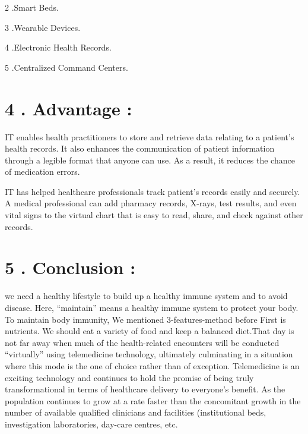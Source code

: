 \documentclass[12pt]{article}
\begin{document}
 2 .Smart Beds.
  
 3 .Wearable Devices. 
 
 4 .Electronic Health Records.
  
 5 .Centralized Command Centers.
 
\section*{ 4 . Advantage :}
 IT enables health practitioners to store and retrieve data relating to a patient's health records. It also enhances the communication of patient information through a legible format that anyone can use. As a result, it reduces the chance of medication errors. 
 

IT has helped healthcare professionals track patient's records easily and securely. A medical professional can add pharmacy records, X-rays, test results, and even vital signs to the virtual chart that is easy to read, share, and check against other records.

\section*{ 5 . Conclusion :} 
 we need a healthy lifestyle to build up a healthy immune system and to avoid disease. Here, “maintain” means a healthy immune system to protect your body. To maintain body immunity, We mentioned 3-features-method before First is nutrients. We should eat a variety of food and keep a balanced diet.That day is not far away when much of the health-related encounters will be
conducted “virtually” using telemedicine technology, ultimately culminating in a
situation where this mode is the one of choice rather than of exception.
Telemedicine is an exciting technology and continues to hold the promise of
being truly transformational in terms of healthcare delivery to everyone’s benefit.
As the population continues to grow at a rate faster than the concomitant growth in
the number of available qualified clinicians and facilities (institutional beds, investigation laboratories, day-care centres, etc.
\end{document}
